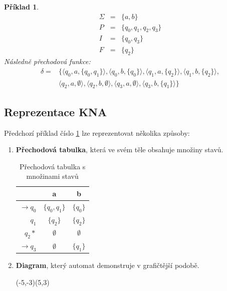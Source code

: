 \documentclass[10pt, a4paper, titlepage]{article}
\theoremstyle{note}
\newtheorem{priklad}{\textbf{Příklad}}
\begin{document}
\begin{priklad}\label{priklad-3}
\begin{eqnarray*}
\Sigma &=& \lbrace a, b \rbrace \\
P &=& \lbrace q_{0}, q_{1}, q_{2}, q_{3} \rbrace \\
I &=& \lbrace q_{0}, q_{3} \rbrace \\
F &=& \lbrace q_{2} \rbrace 
\end{eqnarray*}
Následně přechodová funkce:
\begin{eqnarray*}
\delta =&
\lbrace
\langle q_{0}, a, \lbrace q_{0},q_{1} \rbrace \rangle,
\langle q_{0}, b, \lbrace q_{0} \rbrace \rangle,
\langle q_{1}, a, \lbrace q_{2} \rbrace \rangle,
\langle q_{1}, b, \lbrace q_{2} \rbrace \rangle, \\
& \langle q_{2}, a, \emptyset \rangle,
\langle q_{2}, b, \emptyset \rangle,
\langle q_{3}, a, \emptyset \rangle,
\langle q_{3}, b, \lbrace q_{1} \rbrace \rangle 
\rbrace
\end{eqnarray*}
\end{priklad}

\subsection{Reprezentace KNA}
Předchozí příklad číslo \ref{priklad-3} lze reprezentovat několika způsoby:
\begin{enumerate}
\item
\textbf{Přechodová tabulka}, která ve svém těle obsahuje množiny stavů.
\begin{table}[h]
\begin{center}
\begin{tabular}{ r || c | c }                   
   & a & b \\
   \hline
   $ \rightarrow q_{0} $ & $ \lbrace q_{0},q_{1} \rbrace $ & $ \lbrace q_{0} \rbrace $ \\
   $ q_{1} $ & $ \lbrace q_{2} \rbrace $ & $ \lbrace q_{2} \rbrace $ \\
   $ q_{2} * $ & $ \emptyset $ & $ \emptyset $ \\
   $ \rightarrow q_{3} $ & $ \emptyset $ & $ \lbrace q_{1} \rbrace $ \\ 
\end{tabular}
\end{center}
\caption{Přechodová tabulka s množinami stavů}
\end{table}

\item
\textbf{Diagram}, který automat demonstruje v grafičtější podobě.

\begin{center}
\begin{VCPicture}{(-5,-3)(5,3)}
\end{VCPicture}
\end{center}


\end{enumerate}
\end{document}
